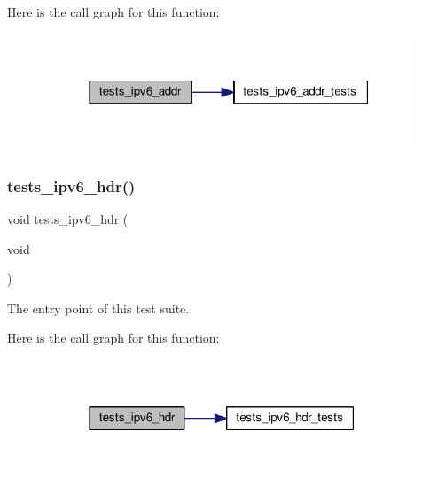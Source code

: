 Here is the call graph for this function\+:
\nopagebreak
\begin{figure}[H]
\begin{center}
\leavevmode
\includegraphics[width=315pt]{group__unittests_gaa968d7cf1c200e4ec0394693683d8260_cgraph}
\end{center}
\end{figure}
\mbox{\label{group__unittests_ga24225364efd039f0cdd38e4286bed7c5}} 
\subsubsection{\texorpdfstring{tests\+\_\+ipv6\+\_\+hdr()}{tests\_ipv6\_hdr()}}
{\footnotesize\ttfamily void tests\+\_\+ipv6\+\_\+hdr (\begin{DoxyParamCaption}\item[{void}]{ }\end{DoxyParamCaption})}



The entry point of this test suite. 

Here is the call graph for this function\+:
\nopagebreak
\begin{figure}[H]
\begin{center}
\leavevmode
\includegraphics[width=303pt]{group__unittests_ga24225364efd039f0cdd38e4286bed7c5_cgraph}
\end{center}
\end{figure}
\mbox{\label{group__unittests_ga011adecd50fb31c2e9fb4b402259fab3}} 
